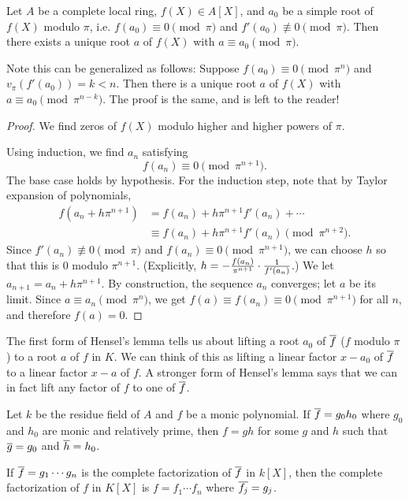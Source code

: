 \begin{lem}
Let $A$ be a complete local ring, $f(X)\in A[X]$, and $a_0$ be a simple root of $f(X)$ modulo $\pi$, i.e. $f(a_0)\equiv 0\pmod{\pi}$ and $f'(a_0)\nequiv 0\pmod{\pi}$. Then there exists a unique root $a$ of $f(X)$ with $a\equiv a_0\pmod{\pi}$.
\end{lem}
Note this can be generalized as follows: Suppose $f(a_0)\equiv 0\pmod{\pi^n}$ and $v_{\pi}(f'(a_0))=k<n$. Then there is a unique root $a$ of $f(X)$ with $a\equiv a_0\pmod{\pi^{n-k}}$. The proof is the same, and is left to the reader!
\begin{proof}
We find zeros of $f(X)$ modulo higher and higher powers of $\pi$.

Using induction, we find %
$a_n$ satisfying 
\[
f(a_n)\equiv 0\pmod{\pi^{n+1}}.
\]
The base case holds by hypothesis. For the induction step, note that by Taylor expansion of polynomials,
\begin{align*}
f(a_n+h\pi^{n+1})&=f(a_n)+h\pi^{n+1}f'(a_n)+\cdots\\
&\equiv f(a_n)+h\pi^{n+1}f'(a_n)\pmod{\pi^{n+2}}.
\end{align*}
Since $f'(a_n)\nequiv 0\pmod{\pi}$ and $f(a_n)\equiv 0\pmod{\pi^{n+1}}$, we can choose $h$ so that this is 0 modulo $\pi^{n+1}$. (Explicitly, $h=-\frac{f(a_n)}{\pi^{n+1}}\cdot \frac{1}{f'(a_n)}$.) We let $a_{n+1}=a_n+h\pi^{n+1}$. By construction, the sequence $a_n$ converges; let $a$ be its limit. Since $a\equiv a_n\pmod{\pi^n}$, we get $f(a)\equiv f(a_n)\equiv 0\pmod{\pi^{n+1}}$ for all $n$, and therefore $f(a)=0$.
\end{proof}
The first form of Hensel's lemma tells us about lifting a root $a_0$ of $\overline{f}$ ($f$ modulo $\pi$) to a root $a$ of $f$ in $K$. We can think of this as lifting a linear factor $x-a_0$ of $\overline{f}$ to a linear factor $x-a$ of $f$. A stronger form of Hensel's lemma says that we can in fact lift any factor of $f$ to one of $\overline{f}$.
\begin{thm}
Let $k$ be the residue field of $A$ and $f$ be a monic polynomial. If $\overline{f}=g_0h_0$ where $g_0$ and $h_0$ are monic and relatively prime, then $f=gh$ for some $g$ and $h$ such that $\overline{g}=g_0$ and $\overline{h}=h_0$.

If $\overline{f}=g_1\cdots g_n$ is the complete factorization of $\overline{f}$ in $k[X]$, then the complete factorization of $f$ in $K[X]$ is $f=f_1\cdots f_n$ where $\overline{f_j}=g_j$.
\end{thm}
